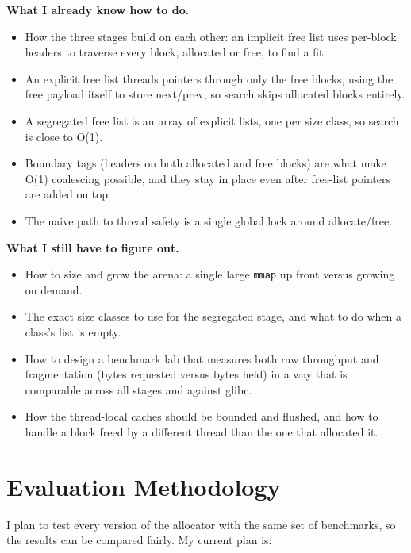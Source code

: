 \documentclass[12pt,letterpaper]{article}
\begin{document}
\textbf{What I already know how to do.}
\begin{itemize}
    \item How the three stages build on each other: an implicit free list uses per-block headers to traverse every block, allocated or free, to find a fit.
    \item An explicit free list threads pointers through only the free blocks, using the free payload itself to store next/prev, so search skips allocated blocks entirely.
    \item A segregated free list is an array of explicit lists, one per size class, so search is close to O(1).
    \item Boundary tags (headers on both allocated and free blocks) are what make O(1) coalescing possible, and they stay in place even after free-list pointers are added on top.
    \item The naive path to thread safety is a single global lock around allocate/free.
\end{itemize}

\textbf{What I still have to figure out.}
\begin{itemize}
    \item How to size and grow the arena: a single large \texttt{mmap} up front versus growing on demand.
    \item The exact size classes to use for the segregated stage, and what to do when a class's list is empty.
    \item How to design a benchmark lab that measures both raw throughput and fragmentation (bytes requested versus bytes held) in a way that is comparable across all stages and against glibc.
    \item How the thread-local caches should be bounded and flushed, and how to handle a block freed by a different thread than the one that allocated it.
\end{itemize}
\section*{Evaluation Methodology}

I plan to test every version of the allocator with the same set of benchmarks, so the results can be compared fairly. My current plan is:
\end{document}
